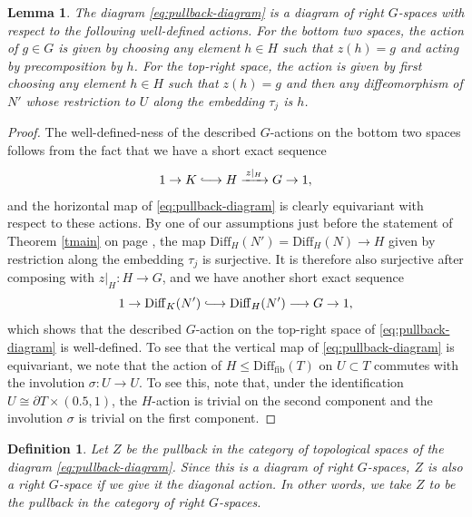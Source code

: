 \documentclass[reqno,a4paper]{article}
\numberwithin{equation}{section}
\theoremstyle{italicised}
\newtheorem{lem}[thm]{Lemma}
\theoremstyle{upright}
\newtheorem{defn}[thm]{Definition}
\theoremstyle{italicised-restate}
\newcommand{\lhto}{\lhook\joinrel\longrightarrow}
\renewcommand{\leq}{\leqslant}
\begin{document}
\begin{lem}
The diagram \eqref{eq:pullback-diagram} is a diagram of right $G$-spaces with respect to the following well-defined actions. For the bottom two spaces, the action of $g \in G$ is given by choosing any element $h \in H$ such that $z(h)=g$ and acting by precomposition by $h$. For the top-right space, the action is given by first choosing any element $h \in H$ such that $z(h)=g$ and then any diffeomorphism of $N'$ whose restriction to $U$ along the embedding $\tau_j$ is $h$.
\end{lem}
\begin{proof}
The well-defined-ness of the described $G$-actions on the bottom two spaces follows from the fact that we have a short exact sequence
\[
1 \to K \lhto H \xrightarrow{\, z|_H \,} G \to 1,
\]
and the horizontal map of \eqref{eq:pullback-diagram} is clearly equivariant with respect to these actions. By one of our assumptions just before the statement of Theorem \ref{tmain} on page \pageref{tmain}, the map $\mathrm{Diff}_H(N') = \mathrm{Diff}_H(N) \to H$ given by restriction along the embedding $\tau_j$ is surjective. It is therefore also surjective after composing with $z|_H \colon H \to G$, and we have another short exact sequence
\[
1 \to \mathrm{Diff}_K(N') \lhto \mathrm{Diff}_H(N') \longrightarrow G \to 1,
\]
which shows that the described $G$-action on the top-right space of \eqref{eq:pullback-diagram} is well-defined. To see that the vertical map of \eqref{eq:pullback-diagram} is equivariant, we note that the action of $H \leq \mathrm{Diff}_{\mathrm{fib}}(T)$ on $U \subset T$ commutes with the involution $\sigma \colon U \to U$. To see this, note that, under the identification $U \cong \partial T \times (0.5,1)$, the $H$-action is trivial on the second component and the involution $\sigma$ is trivial on the first component.
\end{proof}

\begin{defn}
Let $Z$ be the pullback in the category of topological spaces of the diagram \eqref{eq:pullback-diagram}. Since this is a diagram of right $G$-spaces, $Z$ is also a right $G$-space if we give it the diagonal action. In other words, we take $Z$ to be the pullback in the category of right $G$-spaces.
\end{defn}
\end{document}
